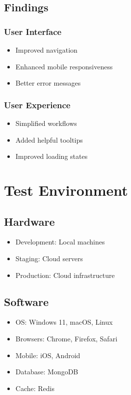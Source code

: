 \subsection{Findings}

\subsubsection{User Interface}
\begin{itemize}
    \item Improved navigation
    \item Enhanced mobile responsiveness
    \item Better error messages
\end{itemize}

\subsubsection{User Experience}
\begin{itemize}
    \item Simplified workflows
    \item Added helpful tooltips
    \item Improved loading states
\end{itemize}

\section{Test Environment}

\subsection{Hardware}
\begin{itemize}
    \item Development: Local machines
    \item Staging: Cloud servers
    \item Production: Cloud infrastructure
\end{itemize}

\subsection{Software}
\begin{itemize}
    \item OS: Windows 11, macOS, Linux
    \item Browsers: Chrome, Firefox, Safari
    \item Mobile: iOS, Android
    \item Database: MongoDB
    \item Cache: Redis
\end{itemize}


